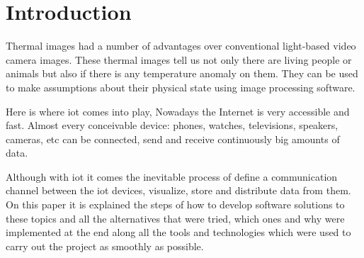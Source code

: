 \documentclass[hidelinks,11pt,a4paper,oneside,article]{memoir}
\begin{document}


\newpage

\pagestyle{plain}

\setcounter{page}{1} %
\ClearWallPaper

\sloppy %

\chapter{Introduction}


Thermal images had a number of advantages over conventional light-based video camera images. These thermal images tell us not only there are living people or animals but also if there is any temperature anomaly on them. They can be used to make assumptions about their physical state using image processing software.

Here is where \gls{iot} comes into play, Nowadays the Internet is very accessible and fast. Almost every conceivable device: phones, watches, televisions, speakers, cameras, etc can be connected, send and receive continuously big amounts of data.

Although with \gls{iot} it comes the inevitable process of define a communication channel between the \gls{iot} devices, visualize, store and distribute data from them. On this paper it is explained the steps of how to develop software solutions to these topics and all the alternatives that were tried, which ones and why were implemented at the end along all the tools and technologies which were used to carry out the project as smoothly as possible.
\end{document}
